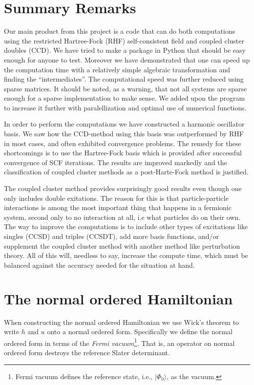 \documentclass[
    a4paper, aps, twocolumn, floatfix, superscriptaddress,
    nofootinbib]{revtex4-1}
\newcommand{\1}{\mathds{1}}
\newcommand{\ket}[1]{\rvert #1\rangle}
\newcommand{\kslat}{\ket{\Phi_0}}
\begin{document}
\section{Summary Remarks}
    Our main product from this project is a code that can do both computations
    using the restricted Hartree-Fock (RHF) self-consistent field and coupled
    cluster doubles (CCD). We have tried to make a package in Python that should
    be easy enough for anyone to test.  Moreover we have demonstrated that one
    can speed up the computation time with a relatively simple algebraic
    transformation and finding the ``intermediates''. The computational speed
    was further reduced using sparse matrices. It should be noted, as a warning,
    that not all systems are sparse enough for a sparse implementation to make
    sense.  We added upon the program to increase it further with
    paralellization and optimal use of numerical functions.

    In order to perform the computations we have constructed a harmonic
    oscillator basis. We saw how the CCD-method using this basis was
    outperformed by RHF in most cases, and often exhibited convergence problems.
    The remedy for these shortcomings is to use the Hartree-Fock basis which is
    provided after successful convergence of SCF iterations. The results are
    improved markedly and the classification of coupled cluster methods as a
    post-Harte-Fock method is justified.

    The coupled cluster method provides surprisingly good results even though
    one only includes double exitations. The reason for this is that
    particle-particle interactions is among the most important thing that
    happens in a fermionic system, second only to no interaction at all, i.e
    what particles do on their own. The way to improve the computations is to
    include other types of excitations like singles (CCSD) and triples (CCSDT),
    add more basis functions, and/or supplement the coupled cluster method with
    another method like perturbation theory. All of this will, needless to say,
    increase the compute time, which must be balanced against the accuracy
    needed for the situation at hand.

\vfill
\newpage
\appendix
\section{The normal ordered Hamiltonian}
    When constructing the normal ordered Hamiltonian we use Wick's theorem to
    write $h$ and $u$ onto a normal ordered form. Specifically we define the
    normal ordered form in terms of the \emph{Fermi vacuum}\footnote{Fermi
    vacuum defines the reference state, i.e., $\kslat$, as the vacuum.}. That
    is, an operator on normal ordered form destroys the reference Slater
    determinant.
\end{document}
